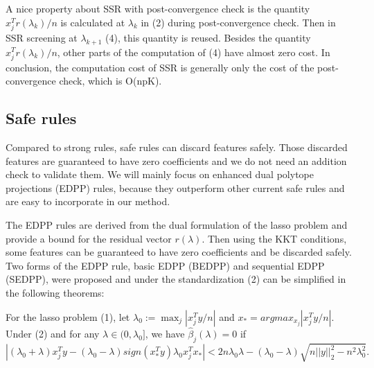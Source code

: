 A nice property about SSR with post-convergence check is the quantity $x_j^Tr(\lambda_k)/n$ is calculated at $\lambda_k$ in (2) during post-convergence check. Then in SSR screening at $\lambda_{k+1}$ (4), this quantity is reused. Besides the quantity $x_j^Tr(\lambda_k)/n$, other parts of the computation of (4) have almost zero cost. In conclusion, the computation cost of SSR is generally only the cost of the post-convergence check, which is O(npK).

\subsection{Safe rules}

Compared to strong rules, safe rules can discard features safely. Those discarded features are guaranteed to have zero coefficients and we do not need an addition check to validate them. We will mainly focus on enhanced dual polytope projections (EDPP) rules\citep{wang2013lasso}, because they outperform other current safe rules and are easy to incorporate in our method.

The EDPP rules are derived from the dual formulation of the lasso problem and provide a bound for the residual vector $r(\lambda)$. Then using the KKT conditions, some features can be guaranteed to have zero coefficients and be discarded safely. Two forms of the EDPP rule, basic EDPP (BEDPP) and sequential EDPP (SEDPP)\citep{wang2013lasso}, were proposed and under the standardization (2) can be simplified in the following theorems\citep{zeng2021hybrid}:

\begin{theorem}[BEDPP]
    For the lasso problem (1), let $\lambda_0:=\max_j|x_j^Ty/n|$ and $x_*=argmax_{x_j}|x_j^Ty/n|$. Under (2) and for any $\lambda\in(0,\lambda_0]$, we have $\hat{\beta}_j(\lambda)=0$ if
    \begin{equation}
        |(\lambda_0+\lambda)x_j^Ty-(\lambda_0-\lambda)sign(x_*^Ty)\lambda_0x_j^Tx_*|<2n\lambda_0\lambda-(\lambda_0-\lambda)\sqrt{n||y||_2^2-n^2\lambda_0^2}.
    \end{equation}
\end{theorem}

